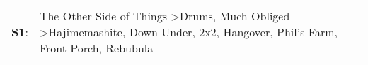 \begin{supertabular}{p{0.03\textwidth}p{0.92\textwidth}}
 \textbf{S1}:  &  The Other Side of Things\textsuperscript{} \textgreater \enspace Drums\textsuperscript{}, \enspace Much Obliged\textsuperscript{} \textgreater \enspace Hajimemashite\textsuperscript{}, \enspace Down Under\textsuperscript{}, \enspace 2x2\textsuperscript{}, \enspace Hangover\textsuperscript{}, \enspace Phil's Farm\textsuperscript{}, \enspace Front Porch\textsuperscript{}, \enspace Rebubula\textsuperscript{}  \enspace  \\
\end{supertabular}
